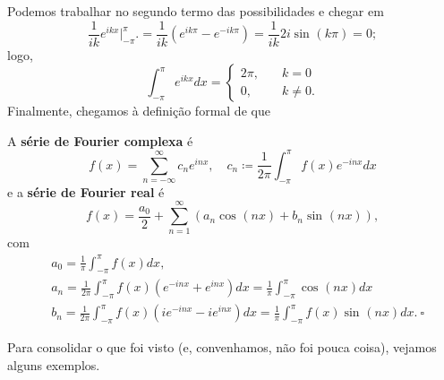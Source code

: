 \documentclass[../pde_notes.tex]{subfiles}
\begin{document}
Podemos trabalhar no segundo termo das possibilidades e chegar em
\[
	\frac{1}{ik}e^{ikx}\biggl|_{-\pi }^{\pi }\biggr. = \frac{1}{ik}(e^{ik\pi }-e^{-ik\pi }) = \frac{1}{ik}2i\sin^{}{(k\pi )} = 0;
\]
logo,
\[
	\int_{-\pi }^{\pi }e^{ikx}dx  = \left\{\begin{array}{ll}
		2\pi , & \quad k = 0   \\
		0,     & \quad k\neq0.
	\end{array}\right.
\]
Finalmente, chegamos à definição formal de que
\begin{def*}
	A \textbf{série de Fourier complexa} é
	\[
		f(x)=\sum\limits_{n=-\infty}^{\infty}c_{n}e^{inx},\quad c_{n}\coloneqq \frac{1}{2\pi }\int_{-\pi }^{\pi }f(x)e^{-inx}dx
	\]
	e a \textbf{série de Fourier real} é
	\[
		f(x) = \frac{a_{0}}{2} + \sum\limits_{n=1}^{\infty}(a_{n}\cos^{}{(nx)}+b_{n}\sin^{}{(nx)}),
	\]
	com
	\begin{align*}
		 & a_{0} = \frac{1}{\pi }\int_{-\pi }^{\pi }f(x)dx,                                                                                       \\
		 & a_{n}=\frac{1}{2\pi }\int_{-\pi }^{\pi }f(x)(e^{-inx}+e^{inx})dx = \frac{1}{\pi }\int_{-\pi }^{\pi }\cos^{}{(nx)}dx                    \\
		 & b_{n} = \frac{1}{2\pi }\int_{-\pi }^{\pi }f(x)(ie^{-inx}-ie^{inx})dx = \frac{1}{\pi }\int_{-\pi }^{\pi }f(x)\sin^{}{(nx)}dx.\: \square
	\end{align*}
\end{def*}
Para consolidar o que foi visto (e, convenhamos, não foi pouca coisa), vejamos alguns exemplos.
\end{document}
